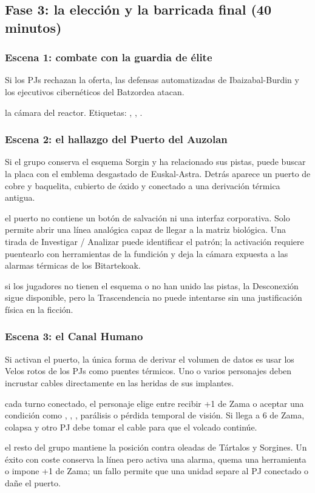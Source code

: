 \subsection{Fase 3: la elección y la barricada final (40 minutos)}

\subsubsection{Escena 1: combate con la guardia de élite}
Si los PJs rechazan la oferta, las defensas automatizadas de Ibaizabal-Burdin y los ejecutivos cibernéticos del Batzordea atacan.\par
{} la cámara del reactor. Etiquetas: , , .

\subsubsection{Escena 2: el hallazgo del Puerto del Auzolan}
Si el grupo conserva el esquema Sorgin y ha relacionado sus pistas, puede buscar la placa con el emblema desgastado de Euskal-Astra. Detrás aparece un puerto de cobre y baquelita, cubierto de óxido y conectado a una derivación térmica antigua.\par
{} el puerto no contiene un botón de salvación ni una interfaz corporativa. Solo permite abrir una línea analógica capaz de llegar a la matriz biológica. Una tirada de Investigar / Analizar puede identificar el patrón; la activación requiere puentearlo con herramientas de la fundición y deja la cámara expuesta a las alarmas térmicas de los Bitartekoak.\par
{} si los jugadores no tienen el esquema o no han unido las pistas, la Desconexión sigue disponible, pero la Trascendencia no puede intentarse sin una justificación física en la ficción.

\subsubsection{Escena 3: el Canal Humano}
Si activan el puerto, la única forma de derivar el volumen de datos es usar los Velos rotos de los PJs como puentes térmicos. Uno o varios personajes deben incrustar cables directamente en las heridas de sus implantes.\par
{} cada turno conectado, el personaje elige entre recibir +1 de Zama o aceptar una condición como , , , parálisis o pérdida temporal de visión. Si llega a 6 de Zama, colapsa y otro PJ debe tomar el cable para que el volcado continúe.\par
{} el resto del grupo mantiene la posición contra oleadas de Tártalos y Sorgines. Un éxito con coste conserva la línea pero activa una alarma, quema una herramienta o impone +1 de Zama; un fallo permite que una unidad separe al PJ conectado o dañe el puerto.

